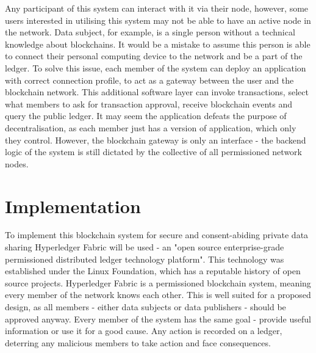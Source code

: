 \documentclass[12pt]{article}
\begin{document}
    Any participant of this system can interact with it via their node, however, some users interested in utilising this system may not be able to have an active node in the network. Data subject, for example, is a single person without a technical knowledge about blockchains. It would be a mistake to assume this person is able to connect their personal computing device to the network and be a part of the ledger. To solve this issue, each member of the system can deploy an application with correct connection profile, to act as a gateway between the user and the blockchain network. This additional software layer can invoke transactions, select what members to ask for transaction approval, receive blockchain events and query the public ledger. It may seem the application defeats the purpose of decentralisation, as each member just has a version of application, which only they control. However, the blockchain gateway is only an interface - the backend logic of the system is still dictated by the collective of all permissioned network nodes.
    
    \section{Implementation}
    
    To implement this blockchain system for secure and consent-abiding private data sharing Hyperledger Fabric will be used - an "open source enterprise-grade permissioned distributed ledger technology platform"\cite{fabric}. This technology was established under the Linux Foundation, which has a reputable history of open source projects. Hyperledger Fabric is a permissioned blockchain system, meaning every member of the network knows each other. This is well suited for a proposed design, as all members - either data subjects or data publishers - should be approved anyway. Every member of the system has the same goal - provide useful information or use it for a good cause. Any action is recorded on a ledger, deterring any malicious members to take action and face consequences.
\end{document}

